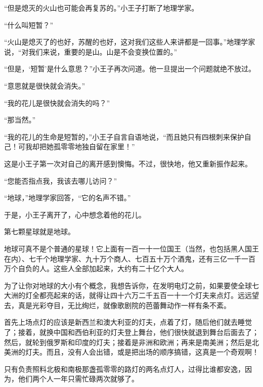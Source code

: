 “但是熄灭的火山也可能会再复苏的。”小王子打断了地理学家。

“什么叫短暂？”

“火山是熄灭了的也好，苏醒的也好，这对我们这些人来讲都是一回事。”地理学家说，“对我们来说，重要的是山。山是不会变换位置的。”

“但是，‘短暂'是什么意思？”小王子再次问道。他一旦提出一个问题就绝不放过。

“意思就是很快就会消失。”

“我的花儿是很快就会消失的吗？”

“那当然。”

“我的花儿的生命是短暂的，”小王子自言自语地说，“而且她只有四根刺来保护自己！可我却把她孤零零地独自留在家里！”

这是小王子第一次对自己的离开感到懊悔。不过，很快地，他又重新振作起来。

“您能否指点我，我该去哪儿访问？”

“地球，”地理学家回答，“它的名声不错。”

于是，小王子离开了，心中想念着他的花儿。


\stoptitle

\starttitle[title={16}]

第七颗星球就是地球。

地球可真不是个普通的星球！它上面有一百一十一位国王（当然，也包括黑人国王在内）、七千个地理学家、九十万个商人、七百五十万个酒鬼，还有三亿一千一百万个自负的人。这些人全部加起来，大约有二十亿个大人。

为了让你对地球的大小有个概念，我想告诉你，在发明电灯之前，如果要使全球七大洲的灯全都亮起来的话，就得让四十六万二千五百一十一个灯夫来点灯。远远望去，真是光彩夺目，无比绚烂，就像歌剧院的芭蕾舞动作一样有条不紊。

首先上场点灯的应该是新西兰和澳大利亚的灯夫，点着了灯，随后他们就去睡觉了；接着，就换中国和西伯利亚的灯夫登上舞台，他们很快就退到舞台后面去了；然后，就轮到俄罗斯和印度的灯夫；接着是非洲和欧洲；再来是南美洲；然后是北美洲的灯夫。而且，没有人会出错，或是把出场的顺序搞错，这真是一个奇观啊！

{\startalignment[center]
 \stopalignment}

只有负责照料北极和南极那盏孤零零的路灯的两名点灯人，过得比谁都安逸，因为，他们两个人一年只需忙碌两次就够了。


